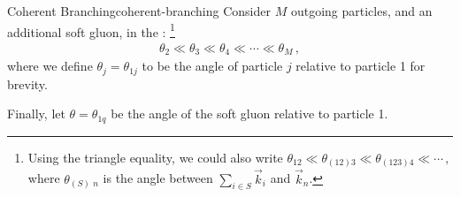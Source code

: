 \begin{lemma}{Coherent Branching}{coherent-branching}
    Consider \(M\) outgoing particles, and an additional soft gluon, in the :%
    \footnote{
        Using the triangle equality, we could also write
        \(
            \theta_{12} \ll \theta_{(12)3} \ll \theta_{(123)4} \ll \cdots
            \,,
        \)
        where \(\theta_{(S)\,\,n}\) is the angle between \(\sum_{i\in S} \vec{k}_i\) and \(\vec{k}_n\).
    }
    \begin{align}
        \theta_{2} \ll \theta_{3} \ll \theta_{4}
        \ll
        \cdots
        \ll
        \theta_M
        \,,
    \end{align}
    where we define \(\theta_j = \theta_{1j}\) to be the angle of particle \(j\) relative to particle 1 for brevity.

    Finally, let \(\theta = \theta_{1q}\) be the angle of the soft gluon relative to particle 1.



\end{lemma}
